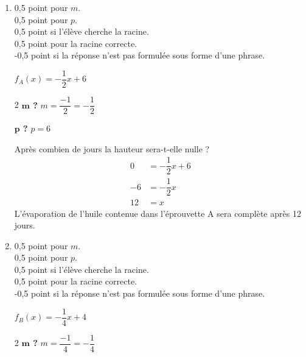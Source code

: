 %
%
    \begin{enumerate}
        \item 0,5 point pour $m$.\\
              0,5 point pour $p$.\\
              0,5 point si l'élève cherche la racine.\\
              0,5 point pour la racine correcte.\\
              -0,5 point si la réponse n'est pas formulée sous forme d'une phrase.

              $f_A(x) = -\dfrac{1}{2}x + 6$
              \begin{multicols}{2}
                  \textbf{$\bm{m}$ ?}
                  \medbreak
                  $m=\dfrac{-1}{2}=-\dfrac{1}{2}$
                  \columnbreak

                  \textbf{$\bm{p}$ ?}
                  \medbreak
                  $p=6$
              \end{multicols}
              Après combien de jours la hauteur sera-t-elle nulle ?
              \begin{align*}
                  0  & = -\dfrac{1}{2}x + 6 \\
                  -6 & = -\dfrac{1}{2}x     \\
                  12 & = x
              \end{align*}
              L'évaporation de l'huile contenue dans l'éprouvette A sera complète après 12 jours.
        \item 0,5 point pour $m$.\\
              0,5 point pour $p$.\\
              0,5 point si l'élève cherche la racine.\\
              0,5 point pour la racine correcte.\\
              -0,5 point si la réponse n'est pas formulée sous forme d'une phrase.

              $f_B(x)=-\dfrac{1}{4}x + 4$
              \begin{multicols}{2}
                  \textbf{$\bm{m}$ ?}
                  \medbreak
                  $m=\dfrac{-1}{4}=-\dfrac{1}{4}$
                  \columnbreak


\end{multicols}
\end{enumerate}
